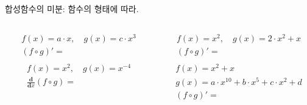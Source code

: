\documentclass[aspectratio=169]{beamer}
\begin{document}
\begin{frame}{합성함수의 미분: 함수의 형태에 따라.}
  \begin{columns}
    \begin{column}{.5\textwidth}
      \begin{align*}
        & f(x) = a \cdot x , \quad g(x) = c \cdot x^3 \\
        & ( {f} \circ {g} )' = \\
      \end{align*}
      \begin{align*}
        & f(x) = x^2 , \quad g(x) = x^{-4} \\
        & \frac{\mathbf{d}}{\mathbf{d}x}( {f} \circ {g} ) = \\
      \end{align*} 
    \end{column}
    \begin{column}{.5\textwidth}
      \begin{align*}
        & f(x) = x^2 , \quad g(x) = 2 \cdot x^2 + x \\
        & ( {f} \circ {g} )' = \\
      \end{align*}
      \begin{align*}
        & f(x) = x^2 + x \\
        & g(x) = a \cdot x^{10} + b \cdot x^5 + c \cdot x^2 + d \\
        & ( {f} \circ {g} )' = \\
      \end{align*}  
    \end{column}
  \end{columns}  
\end{frame}

\begin{frame}%
  
\end{frame}
\end{document}
